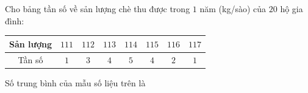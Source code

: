 \begin{ex}
Cho bảng tần số về sản lượng chè thu được trong $1$ năm (kg/sào) của $20$ hộ gia đình:
\begin{center}
\begin{tabular}{|c|c|c|c|c|c|c|c|}\hline
Sản lượng & $111$ & $112$ & $113$ & $114$ & $115$ & $116$ & $117$\\\hline
Tần số & $1$ & $3$ & $4$ & $5$ & $4$ & $2$ & $1$\\\hline
\end{tabular}
\end{center}
Số trung bình của mẫu số liệu trên là
\end{ex}
